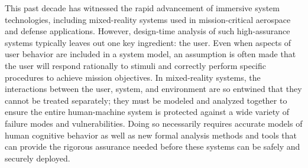 This past decade has witnessed the rapid advancement of immersive system technologies, including mixed-reality systems used in mission-critical aerospace and defense applications. However, design-time analysis of such high-assurance systems typically leaves out one key ingredient: the user. Even when aspects of user behavior are included in a system model, an assumption is often made that the user will respond rationally to stimuli and correctly perform specific procedures to achieve mission objectives. In mixed-reality systems, the interactions between the user, system, and environment are so entwined that they cannot be treated separately; they must be modeled and analyzed together to ensure the entire human-machine system is protected against a wide variety of failure modes and vulnerabilities. Doing so necessarily requires accurate models of human cognitive behavior as well as new formal analysis methods and tools that can provide the rigorous assurance needed before these systems can be safely and securely deployed.

